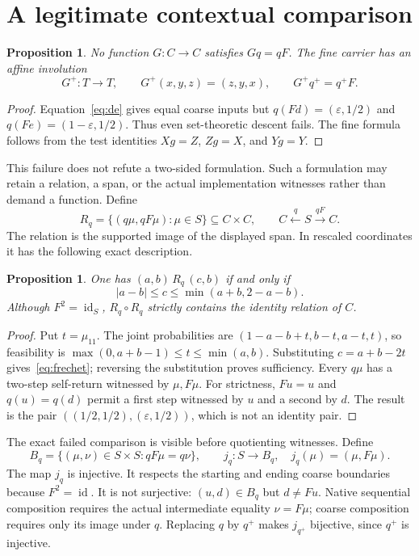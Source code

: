 \documentclass[11pt]{article}
\newtheorem{proposition}[theorem]{Proposition}
\theoremstyle{definition}
\newcommand{\id}{\operatorname{id}}
\newcommand{\eps}{\varepsilon}
\begin{document}
\section{A legitimate contextual comparison}
\label{sec:context}
\begin{proposition}\label{prop:noaction}
No function $G:C\to C$ satisfies $Gq=qF$. The fine carrier has an affine involution
\[
 G^+:T\longrightarrow T,\qquad G^+(x,y,z)=(z,y,x),
 \qquad G^+q^+=q^+F.
\]
\end{proposition}
\begin{proof}
Equation~\eqref{eq:de} gives equal coarse inputs but
$q(Fd)=(\eps,1/2)$ and $q(Fe)=(1-\eps,1/2)$. Thus even set-theoretic descent fails. The fine formula follows from the test identities $Xg=Z$, $Zg=X$, and $Yg=Y$.
\end{proof}
This failure does not refute a two-sided formulation. Such a formulation may retain a relation, a span, or the actual implementation witnesses rather than demand a function. Define
\[
 R_q=\{(q\mu,qF\mu):\mu\in S\}\subseteq C\times C,
 \qquad C\xleftarrow{q}S\xrightarrow{qF}C.
\]
The relation is the supported image of the displayed span. In rescaled coordinates it has the following exact description.

\begin{proposition}\label{prop:relation}
One has $(a,b)\,R_q\,(c,b)$ if and only if
\begin{equation}\label{eq:frechet}
 |a-b|\leq c\leq\min(a+b,2-a-b).
\end{equation}
Although $F^2=\id_S$, $R_q\circ R_q$ strictly contains the identity relation of $C$.
\end{proposition}
\begin{proof}
Put $t=\mu_{11}$. The joint probabilities are
$(1-a-b+t,b-t,a-t,t)$, so feasibility is
$\max(0,a+b-1)\leq t\leq\min(a,b)$. Substituting $c=a+b-2t$ gives~\eqref{eq:frechet}; reversing the substitution proves sufficiency. Every $q\mu$ has a two-step self-return witnessed by $\mu,F\mu$. For strictness, $Fu=u$ and $q(u)=q(d)$ permit a first step witnessed by $u$ and a second by $d$. The result is the pair $((1/2,1/2),(\eps,1/2))$, which is not an identity pair.
\end{proof}
The exact failed comparison is visible before quotienting witnesses. Define
\[
 B_q=\{(\mu,\nu)\in S\times S:qF\mu=q\nu\},\qquad
 j_q:S\longrightarrow B_q,\quad j_q(\mu)=(\mu,F\mu).
\]
The map $j_q$ is injective. It respects the starting and ending coarse boundaries because $F^2=\id$. It is not surjective: $(u,d)\in B_q$ but $d\ne Fu$. Native sequential composition requires the actual intermediate equality $\nu=F\mu$; coarse composition requires only its image under $q$. Replacing $q$ by $q^+$ makes $j_{q^+}$ bijective, since $q^+$ is injective.
\end{document}
